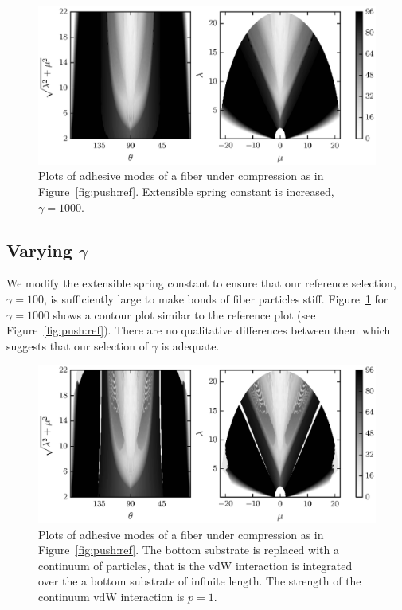 	\begin{figure}[t]
		\begin{center}
			\includegraphics{./fig/ch3/push/g1000/grid.eps}
		\end{center}		
		\caption{Plots of adhesive modes of a fiber under compression as in Figure~\ref{fig:push:ref}. Extensible spring constant is increased, $\gamma=1000$.
		\label{fig:push:g1000}}
	\end{figure}	

\subsection{Varying $\gamma$}

We modify the extensible spring constant to ensure that our reference selection, $\gamma=100$, is sufficiently large to make bonds of fiber particles stiff. Figure~\ref{fig:push:g1000} for $\gamma=1000$ shows a contour plot similar to the reference plot (see Figure~\ref{fig:push:ref}). There are no qualitative differences between them which suggests that our selection of $\gamma$ is adequate.

	\begin{figure}[t]
		\begin{center}
			\includegraphics{./fig/ch3/push/p1/grid.eps}
		\end{center}		
		\caption{Plots of adhesive modes of a fiber under compression as in Figure~\ref{fig:push:ref}. The bottom substrate is replaced with a continuum of particles, that is the vdW interaction is integrated over the a bottom substrate of infinite length. The strength of the continuum vdW interaction is $p=1$.
		\label{fig:push:p1}}
	\end{figure}

